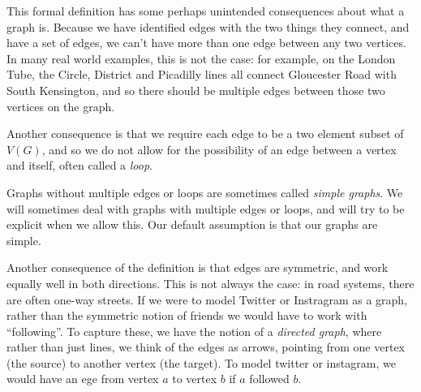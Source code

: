 \documentclass[10pt,]{book}
\theoremstyle{plain}
\theoremstyle{definition}
\theoremstyle{definition}
\begin{document}
\hypertarget{p-8}{}%
This formal definition has some perhaps unintended consequences about what a graph is.  Because we have identified edges with the two things they connect, and have a set of edges, we can't have more than one edge between any two vertices.  In many real world examples, this is not the case: for example, on the London Tube, the Circle, District and Picadilly lines all connect Gloucester Road with South Kensington, and so there should be multiple edges between those two vertices on the graph.%
\par
\hypertarget{p-9}{}%
Another consequence is that we require each edge to be a two element subset of \(V(G)\), and so we do not allow for the possibility of an edge between a vertex and itself, often called a \emph{loop}.%
\par
\hypertarget{p-10}{}%
Graphs without multiple edges or loops are sometimes called \emph{simple graphs}.  We will sometimes deal with graphs with multiple edges or loops, and will try to be explicit when we allow this.  Our default assumption is that our graphs are simple.%
\par
\hypertarget{p-11}{}%
Another consequence of the definition is that edges are symmetric, and work equally well in both directions.  This is not always the case: in road systems, there are often one-way streets.  If we were to model Twitter or Instragram as a graph, rather than the symmetric notion of friends we would have to work with ``following''.  To capture these, we have the notion of a \emph{directed graph}, where rather than just lines, we think of the edges as arrows, pointing from one vertex (the source) to another vertex (the target).  To model twitter or instagram, we would have an ege from vertex \(a\) to vertex \(b\) if \(a\) followed \(b\).%
\typeout{************************************************}
\typeout{************************************************}
\end{document}
